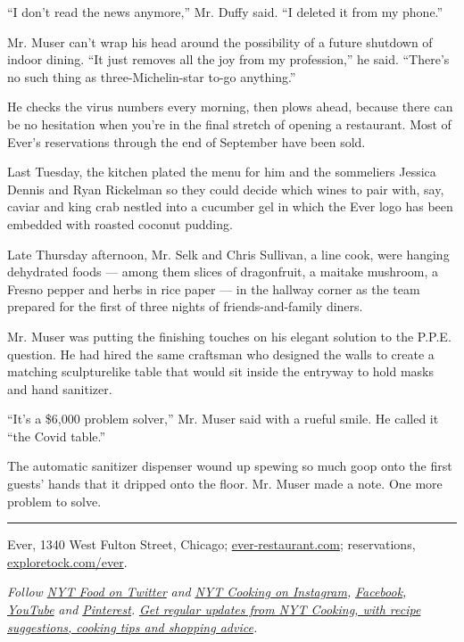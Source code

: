 ``I don't read the news anymore,'' Mr. Duffy said. ``I deleted it from
my phone.''

Mr. Muser can't wrap his head around the possibility of a future
shutdown of indoor dining. ``It just removes all the joy from my
profession,'' he said. ``There's no such thing as three-Michelin-star
to-go anything.''

He checks the virus numbers every morning, then plows ahead, because
there can be no hesitation when you're in the final stretch of opening a
restaurant. Most of Ever's reservations through the end of September
have been sold.

Last Tuesday, the kitchen plated the menu for him and the sommeliers
Jessica Dennis and Ryan Rickelman so they could decide which wines to
pair with, say, caviar and king crab nestled into a cucumber gel in
which the Ever logo has been embedded with roasted coconut pudding.

Late Thursday afternoon, Mr. Selk and Chris Sullivan, a line cook, were
hanging dehydrated foods --- among them slices of dragonfruit, a maitake
mushroom, a Fresno pepper and herbs in rice paper --- in the hallway
corner as the team prepared for the first of three nights of
friends-and-family diners.

Mr. Muser was putting the finishing touches on his elegant solution to
the P.P.E. question. He had hired the same craftsman who designed the
walls to create a matching sculpturelike table that would sit inside the
entryway to hold masks and hand sanitizer.

``It's a \$6,000 problem solver,'' Mr. Muser said with a rueful smile.
He called it ``the Covid table.''

The automatic sanitizer dispenser wound up spewing so much goop onto the
first guests' hands that it dripped onto the floor. Mr. Muser made a
note. One more problem to solve.

\begin{center}\rule{0.5\linewidth}{\linethickness}\end{center}

Ever, 1340 West Fulton Street, Chicago;
\href{https://www.ever-restaurant.com/}{ever-restaurant.com};
reservations,
\href{https://www.exploretock.com/ever}{exploretock.com/ever}.

\emph{Follow} \href{https://twitter.com/nytfood}{\emph{NYT Food on
Twitter}} \emph{and}
\href{https://www.instagram.com/nytcooking/}{\emph{NYT Cooking on
Instagram}}\emph{,}
\href{https://www.facebookcorewwwi.onion/nytcooking/}{\emph{Facebook}}\emph{,}
\href{https://www.youtube.com/nytcooking}{\emph{YouTube}} \emph{and}
\href{https://www.pinterest.com/nytcooking/}{\emph{Pinterest}}\emph{.}
\href{https://www.nytimes3xbfgragh.onion/newsletters/cooking}{\emph{Get
regular updates from NYT Cooking, with recipe suggestions, cooking tips
and shopping advice}}\emph{.}

